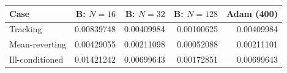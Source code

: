 \begin{tabular}{lrrrr}
\toprule
Case & B: $N=16$ & B: $N=32$ & B: $N=128$ & Adam (400) \\
\midrule
Tracking & 0.00839748 & 0.00409984 & 0.00100625 & 0.00409984 \\
Mean-reverting & 0.00429055 & 0.00211098 & 0.00052088 & 0.00211101 \\
Ill-conditioned & 0.01421242 & 0.00699643 & 0.00172851 & 0.00699643 \\
\bottomrule
\end{tabular}
